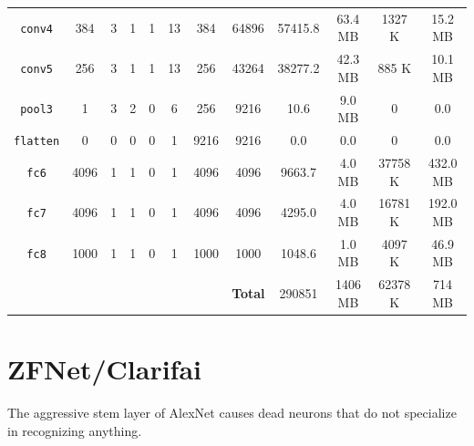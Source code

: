 \begin{table}[H]
\begin{tabular}{cccccccccccc}
        \cmidrule(lr){1-12}
        \texttt{conv4}      & \num{384}   & \num{3}     & \num{1}     & \num{1} & \num{13}    & \num{384}   & \num{64896}   & \num{57415.8}   & \num{63.4} {\tiny MB}  & \num{1327} {\tiny K}    & \num{15.2} {\tiny MB}  \\
        \cmidrule(lr){1-12}
        \texttt{conv5}      & \num{256}   & \num{3}     & \num{1}     & \num{1} & \num{13}    & \num{256}   & \num{43264}   & \num{38277.2}   & \num{42.3} {\tiny MB}  & \num{885} {\tiny K}     & \num{10.1} {\tiny MB}  \\
        \texttt{pool3}      & \num{1}     & \num{3}     & \num{2}     & \num{0} & \num{6}     & \num{256}   & \num{9216}    & \num{10.6}      & \num{9.0} {\tiny MB}   & \num{0}                 & \num{0.0}              \\
        \cmidrule(lr){1-12}
        \texttt{flatten}    & \num{0}     & \num{0}     & \num{0}     & \num{0} & \num{1}     & \num{9216}  & \num{9216}    & \num{0.0}       & \num{0.0}              & \num{0}                 & \num{0.0}              \\
        \texttt{fc6}        & \num{4096}  & \num{1}     & \num{1}     & \num{0} & \num{1}     & \num{4096}  & \num{4096}    & \num{9663.7}    & \num{4.0} {\tiny MB}   & \num{37758} {\tiny K}   & \num{432.0} {\tiny MB} \\
        \texttt{fc7}        & \num{4096}  & \num{1}     & \num{1}     & \num{0} & \num{1}     & \num{4096}  & \num{4096}    & \num{4295.0}    & \num{4.0} {\tiny MB}   & \num{16781} {\tiny K}   & \num{192.0} {\tiny MB} \\
        \texttt{fc8}        & \num{1000}  & \num{1}     & \num{1}     & \num{0} & \num{1}     & \num{1000}  & \num{1000}    & \num{1048.6}    & \num{1.0} {\tiny MB}   & \num{4097} {\tiny K}    & \num{46.9} {\tiny MB}  \\
        \midrule
        &&&&&&& \textbf{Total} & \num{290851} & \num{1406} M{\tiny B} & \num{62378} {\tiny K} & \num{714} M{\tiny B} \\
        \bottomrule
    \end{tabular}
\end{table}



\section{ZFNet/Clarifai}

The aggressive stem layer of AlexNet causes dead neurons that do not specialize in recognizing anything.

